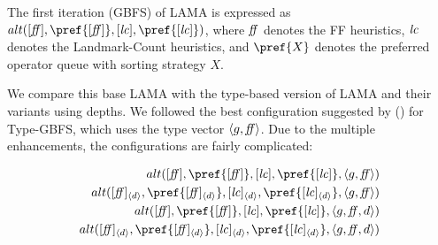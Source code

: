 The first iteration (GBFS) of LAMA is expressed as
$alt([\mit{ff}],\pref{[\mit{ff}]},[\mit{lc}],\pref{[\mit{lc}]})$, where $\mit{ff}$
denotes the FF heuristics, $\mit{lc}$ denotes the Landmark-Count heuristics,
and $\pref{X}$ denotes the preferred operator queue with sorting
strategy $X$.

We compare this base LAMA with the type-based version of LAMA and their
variants using depths.
We followed the best configuration suggested by \citeauthor{xie14type} (\citeyear{xie14type})
for Type-GBFS, which uses the type vector $\brackets{g,\mit{ff}}$.
Due to the multiple enhancements, the configurations are fairly complicated:

\begin{eqnarray}
  alt([\mit{ff}],\pref{[\mit{ff}]},[\mit{lc}],\pref{[\mit{lc}]},\brackets{g,\mit{ff}}) \\
  alt([\mit{ff}]_\brackets{d},\pref{[\mit{ff}]_\brackets{d}},[\mit{lc}]_\brackets{d},\pref{[\mit{lc}]_\brackets{d}},\brackets{g,\mit{ff}}) \\
  alt([\mit{ff}],\pref{[\mit{ff}]},[\mit{lc}],\pref{[\mit{lc}]},\brackets{g,\mit{ff},d}) \\
  alt([\mit{ff}]_\brackets{d},\pref{[\mit{ff}]_\brackets{d}},[\mit{lc}]_\brackets{d},\pref{[\mit{lc}]_\brackets{d}},\brackets{g,\mit{ff},d}) 
\end{eqnarray}


